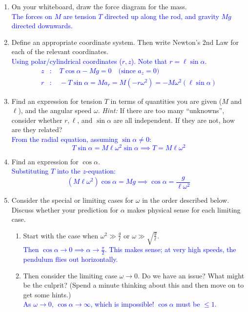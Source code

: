 \documentclass[11pt, letterpaper, openany]{book}
\newenvironment{exercise}[1][Exercise]{%
  \tcolorbox[blanker, breakable, left=1em,
    before skip=1em, after skip=1em,
    borderline west={3pt}{0pt}{PhysNavy},
    colback=PhysCream,
    before upper={\textcolor{PhysNavy}{\sffamily\bfseries #1:}\space}
  ]%
}{%
  \endtcolorbox%
}
\begin{document}
\begin{exercise}[Exercise 3: The Conical Pendulum]
\begin{enumerate}[label=(\alph*)]
    \item On your whiteboard, draw the force diagram for the mass. \\
    \textcolor{blue}{The forces on $M$ are tension $T$ directed up along the rod, and gravity $Mg$ directed downwards.}
    
    \item Define an appropriate coordinate system. Then write Newton's 2nd Law for each of the relevant coordinates. \\
    \textcolor{blue}{Using polar/cylindrical coordinates ($r, z$). Note that $r = \ell\sin\alpha$.
    \begin{align*}
        z&: \quad T\cos\alpha - Mg = 0 \quad \text{(since $a_z = 0$)} \\
        r&: \quad -T\sin\alpha = M a_r = M(-r\omega^2) = -M\omega^2(\ell\sin\alpha)
    \end{align*}
    }
    
    \item Find an expression for tension $T$ in terms of quantities you are given ($M$ and $\ell$), and the angular speed $\omega$.
    \textit{Hint:} If there are too many ``unknowns'', consider whether $r, \ell$, and $\sin\alpha$ are all independent. If they are not, how are they related? \\
    \textcolor{blue}{From the radial equation, assuming $\sin\alpha \neq 0$:
    \[ T\sin\alpha = M\ell\omega^2\sin\alpha \implies T = M\ell\omega^2 \]
    }
    
    \item Find an expression for $\cos\alpha$. \\
    \textcolor{blue}{Substituting $T$ into the $z$-equation:
    \[ (M\ell\omega^2)\cos\alpha = Mg \implies \cos\alpha = \frac{g}{\ell\omega^2} \]
    }
    
    \item Consider the special or limiting cases for $\omega$ in the order described below. Discuss whether your prediction for $\alpha$ makes physical sense for each limiting case.
    \begin{enumerate}[label=(\roman*)]
        \item Start with the case when $\omega^2 \gg \frac{g}{\ell}$ or $\omega \gg \sqrt{\frac{g}{\ell}}$. \\
        \textcolor{blue}{Then $\cos\alpha \to 0 \implies \alpha \to \frac{\pi}{2}$. This makes sense; at very high speeds, the pendulum flies out horizontally.}
        \item Then consider the limiting case $\omega \to 0$. Do we have an issue? What might be the culprit? (Spend a minute thinking about this and then move on to get some hints.) \\
        \textcolor{blue}{As $\omega \to 0$, $\cos\alpha \to \infty$, which is impossible! $\cos\alpha$ must be $\le 1$.}
    \end{enumerate}
    

\end{enumerate}
\end{exercise}
\end{document}
